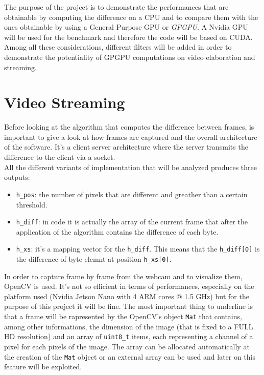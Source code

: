 \documentclass[paper=a4, fontsize=10pt]{scrartcl}	%
\begin{document}
	The purpose of the project is to demonstrate the performances that are obtainable by computing the difference on a CPU and to compare them with the ones obtainable by using a General Purpose GPU or \textit{GPGPU}. A Nvidia GPU will be used for the benchmark and therefore the code will be based on CUDA. Among all these considerations, different filters will be added in order to demonstrate the potentiality of GPGPU computations on video elaboration and streaming.

	\section{Video Streaming}
	\label{sec:streaming}

	Before looking at the algorithm that computes the difference between frames, is important to give a look at how frames are captured and the overall architecture of the software. It's a client server architecture where the server transmits the difference to the client via a socket.\\

	All the different variants of implementation that will be analyzed produces three outputs:

	\begin{itemize}
		\itemsep0sp
		\item \texttt{h\_pos}: the number of pixels that are different and greather than a certain threshold.
		\item \texttt{h\_diff}: in code it is actually the array of the current frame that after the application of the algorithm contains the difference of each byte.
		\item \texttt{h\_xs}: it's a mapping vector for the \texttt{h\_diff}. This means that the \texttt{h\_diff[0]} is the difference of byte elemnt at position \texttt{h\_xs[0]}.
	\end{itemize}
	 
	In order to capture frame by frame from the webcam and to visualize them, OpenCV is used. It's not so efficient in terms of performances, especially on the platform used (Nvidia Jetson Nano with 4 ARM cores @ 1.5 GHz) but for the purpose of this project it will be fine. The most important thing to underline is that a frame will be rapresented by the OpenCV's object \texttt{Mat} that contains, among other informations, the dimension of the image (that is fixed to a FULL HD resolution) and an array of \texttt{uint8\_t} items, each representing a channel of a pixel for each pixels of the image. The array can be allocated automatically at the creation of the \texttt{Mat} object or an external array can be used and later on this feature will be exploited.\\
\end{document}
